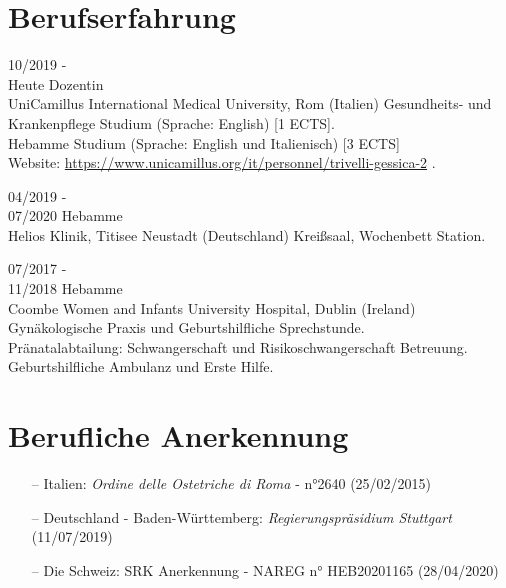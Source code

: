 \documentclass[11pt]{friggeri-cv}
\begin{document}
\vspace{-10pt}
\section{Berufserfahrung}
\begin{entrylist}
  \entry
  {10/2019 -\\Heute}
  {Dozentin}
  {\\UniCamillus International Medical University, Rom (Italien)}
  {
    Gesundheits- und Krankenpflege Studium (Sprache: English) [1 ECTS].\\
    Hebamme Studium (Sprache: English und Italienisch) [3 ECTS] \\
    Website:
    \footnotesize{\url{https://www.unicamillus.org/it/personnel/trivelli-gessica-2}} .
  }

  \entry
  {04/2019 -\\07/2020}
  {Hebamme}
  {\\Helios Klinik, Titisee Neustadt (Deutschland)}
  {Kreißsaal, Wochenbett Station.}

  \entry
  {07/2017 -\\11/2018}
  {Hebamme}
  {\\Coombe Women and Infants University Hospital, Dublin (Ireland)}
  {
    Gyn\"{a}kologische Praxis und Geburtshilfliche Sprechstunde.\\
    Pr\"{a}natalabtailung: Schwangerschaft und Risikoschwangerschaft Betreuung.\\
    Geburtshilfliche Ambulanz und Erste Hilfe.
  }
\end{entrylist}


\vspace{10pt}
\section{Berufliche Anerkennung}
\begin{itemize}
  \item[--] Italien: \emph{Ordine delle Ostetriche di Roma} - n°2640 (25/02/2015)
  \item[--] Deutschland - Baden-W\"{u}rttemberg: \emph{Regierungspr\"{a}sidium Stuttgart} (11/07/2019)
  \item[--] Die Schweiz: SRK Anerkennung - NAREG n° HEB20201165 (28/04/2020)
\end{itemize}


\vspace{20pt}
\end{document}
